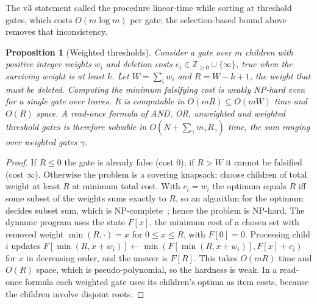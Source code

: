 \documentclass[pdflatex,sn-mathphys-num]{sn-jnl}
\theoremstyle{plain}
\newtheorem{proposition}[theorem]{Proposition}
\theoremstyle{definition}
\begin{document}
The v3 statement called the procedure linear-time while sorting at threshold gates, which costs $O(m\log m)$ per gate; the selection-based bound above removes that inconsistency.

\begin{proposition}[Weighted thresholds]\label{prop:weighted}
Consider a gate over $m$ children with positive integer weights $w_i$ and deletion costs $c_i\in\mathbb{Z}_{\ge0}\cup\{\infty\}$, true when the surviving weight is at least $k$. Let $W=\sum_iw_i$ and $R=W-k+1$, the weight that must be deleted. Computing the minimum falsifying cost is weakly NP-hard even for a single gate over leaves. It is computable in $O(mR)\subseteq O(mW)$ time and $O(R)$ space. A read-once formula of AND, OR, unweighted and weighted threshold gates is therefore solvable in $O(N+\sum_{\gamma}m_\gamma R_\gamma)$ time, the sum ranging over weighted gates $\gamma$.
\end{proposition}
\begin{proof}
If $R\le0$ the gate is already false (cost $0$); if $R>W$ it cannot be falsified (cost $\infty$). Otherwise the problem is a covering knapsack: choose children of total weight at least $R$ at minimum total cost. With $c_i=w_i$ the optimum equals $R$ iff some subset of the weights sums exactly to $R$, so an algorithm for the optimum decides subset sum, which is NP-complete~\cite{karp1972}; hence the problem is NP-hard. The dynamic program uses the state $F[x]$, the minimum cost of a chosen set with removed weight $\min(R,\cdot)=x$ for $0\le x\le R$, with $F[0]=0$. Processing child $i$ updates $F[\min(R,x+w_i)]\leftarrow\min(F[\min(R,x+w_i)],F[x]+c_i)$ for $x$ in decreasing order, and the answer is $F[R]$. This takes $O(mR)$ time and $O(R)$ space, which is pseudo-polynomial, so the hardness is weak. In a read-once formula each weighted gate uses its children's optima as item costs, because the children involve disjoint roots.
\end{proof}
\end{document}
